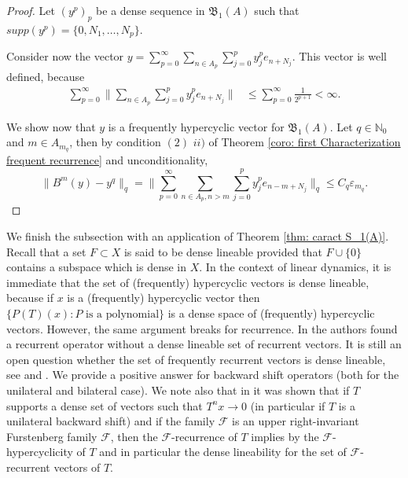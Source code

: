 \documentclass[11pt]{amsart}
\newcommand{\zN}{\mathbb N}
\begin{document}
\begin{proof}
Let $(y^p)_p$ be a dense sequence in $\mathfrak B_1(A)$ such that $supp(y^p)=\{0,N_1,\ldots, N_p\}.$


Consider now the vector $y=\sum_{p=0}^\infty \sum_{n\in A_p} \sum_{j=0}^p y^p_j e_{n+N_j}.$ This vector is well defined, because 
\begin{align*}
\sum_{p=0}^\infty \|\sum_{n\in A_p} \sum_{j=0}^p y^p_j e_{n+N_j}\|&\leq \sum_{p=0}^\infty \frac{1}{ 2^{p+1}}<\infty.    
\end{align*}

We show now that $y$ is a frequently hypercyclic vector for $\mathfrak B_1(A)$. Let $q\in \zN_0$ and $m\in A_{m_q}$, then by condition $(2)$ $ii)$ of Theorem \ref{coro: first Characterization frequent recurrence} and unconditionality,
$$\|B^m(y)-y^{q}\|_q=\|\sum_{p=0}^\infty \sum_{n\in A_p,n>m}\sum_{j=0}^p y^p_j e_{n-m+N_j}\|_q\leq C_q\varepsilon_{m_q}.$$

\end{proof}
We finish the subsection with an application of Theorem \ref{thm: caract S_1(A)}. Recall that a set $F\subset X$ is said to be dense lineable provided that $F\cup\{0\}$ contains a subspace which is dense in $X$. In the context of linear dynamics, it is immediate that the set of (frequently) hypercyclic vectors is dense lineable, because if $x$ is a (frequently) hypercyclic vector then $\{P(T)(x):P \text{ is a polynomial}\}$ is a dense space of (frequently) hypercyclic vectors. However, the same argument breaks for recurrence. In \cite{LopMen25} the authors found a recurrent operator without a dense lineable set of recurrent vectors. It is still an open question whether the set of frequently recurrent vectors is dense lineable, see \cite[Problem 5.1 and Remark 5.3]{GriLopPerQuestions2} and \cite[Problem 4.2]{LopMen25}. We provide a positive answer for backward shift     operators (both for the unilateral and bilateral case). We note also that in \cite[Corollary 4.8]{GriLopPerQuestions2} it was shown that if $T$ supports a dense set of vectors such that $T^nx\to 0$ (in particular if $T$ is a unilateral backward shift) and if the family $\mathcal F$ is an upper right-invariant Furstenberg family $\mathcal F$, then the $\mathcal F$-recurrence of $T$ implies by \cite{BonGroLopPer22JFA} the $\mathcal F$-hypercyclicity of $T$ and in particular the dense lineability for the set of $\mathcal F$-recurrent vectors of $T$. 
\end{document}
